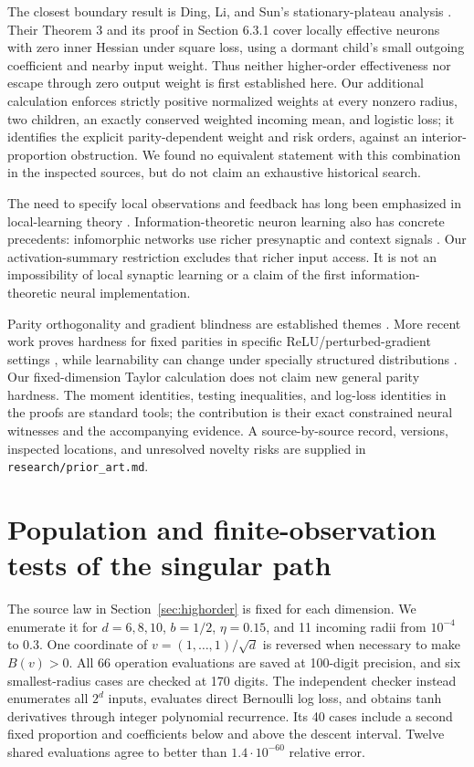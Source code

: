 \documentclass[11pt]{article}
\theoremstyle{remark}\newtheorem{remark}[theorem]{Remark}
\begin{document}
The closest boundary result is Ding, Li, and Sun's stationary-plateau
analysis \cite{ding2026}. Their Theorem 3 and its proof in Section 6.3.1
cover locally effective neurons with zero inner Hessian under square loss,
using a dormant child's small outgoing coefficient and nearby input weight.
Thus neither higher-order effectiveness nor escape through zero output
weight is first established here. Our additional calculation enforces
strictly positive normalized weights at every nonzero radius, two children,
an exactly conserved weighted incoming mean, and logistic loss; it identifies
the explicit parity-dependent weight and risk orders, against an
interior-proportion obstruction. We found no equivalent statement with this
combination in the inspected sources, but do not claim an exhaustive
historical search.

The need to specify local observations and feedback has long been emphasized
in local-learning theory \cite[Sections 6.4 and 7.1]{baldi2016}.
Information-theoretic neuron learning also has concrete precedents:
infomorphic networks use richer presynaptic and context signals
\cite{makkeh2025}. Our activation-summary restriction excludes that richer
input access. It is not an impossibility of local synaptic learning or a
claim of the first information-theoretic neural implementation.

Parity orthogonality and gradient blindness are established themes
\cite[Section 2]{failures2017}. More recent work proves hardness for fixed
parities in specific ReLU/perturbed-gradient settings \cite{shoshani2025},
while learnability can change under specially structured distributions
\cite{daniely2020}. Our fixed-dimension Taylor calculation does not claim
new general parity hardness. The moment identities, testing inequalities,
and log-loss identities in the proofs are standard tools; the contribution
is their exact constrained neural witnesses and the accompanying evidence.
A source-by-source record, versions, inspected locations, and unresolved
novelty risks are supplied in \texttt{research/prior\_art.md}.




\section{Population and finite-observation tests of the singular path}
\label{sec:highcomputations}
The source law in Section~\ref{sec:highorder} is fixed for each dimension.
We enumerate it for $d=6,8,10$, $b=1/2$, $\eta=0.15$, and 11 incoming
radii from $10^{-4}$ to $0.3$. One coordinate of
$v=(1,\ldots,1)/\sqrt d$ is reversed when necessary to make $B(v)>0$.
All 66 operation evaluations are saved at 100-digit precision, and six
smallest-radius cases are checked at 170 digits. The independent checker
instead enumerates all $2^d$ inputs, evaluates direct Bernoulli log loss,
and obtains tanh derivatives through integer polynomial recurrence. Its
40 cases include a second fixed proportion and coefficients below and above
the descent interval. Twelve shared evaluations agree to better than
$1.4\cdot10^{-60}$ relative error.
\end{document}
